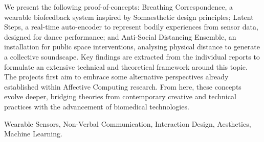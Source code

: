 We present the following proof-of-concepts: Breathing Correspondence, a wearable biofeedback system inspired by Somaesthetic design principles; Latent Steps, a real-time auto-encoder to represent bodily experiences from sensor data, designed for dance performance; and Anti-Social Distancing Ensemble, an installation for public space interventions, analysing physical distance to generate a collective soundscape. Key findings are extracted from the individual reports to formulate an extensive technical and theoretical framework around this topic. The projects first aim to embrace some alternative perspectives already established within Affective Computing research. From here, these concepts evolve deeper, bridging theories from contemporary creative and technical practices with the advancement of biomedical technologies.


\begin{keywords}
Wearable Sensors, Non-Verbal Communication, Interaction Design, Aesthetics, Machine Learning.
\end{keywords}
